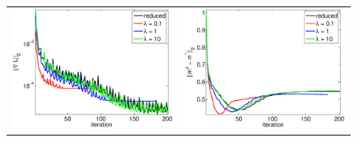 \documentclass{iopart}
\begin{document}
\begin{figure}
\centering
\begin{tabular}{cc}
\includegraphics[scale=.3]{./figs/2D_exp2_b}&
\includegraphics[scale=.3]{./figs/2D_exp2_c}\\
\end{tabular}
\centering
\begin{tabular}{cccc}

\end{tabular}
\end{figure}
\end{document}
